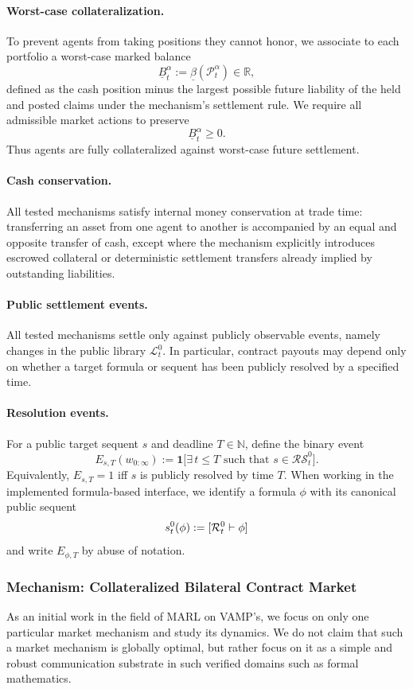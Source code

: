 \paragraph{Worst-case collateralization.}
To prevent agents from taking positions they cannot honor, we associate to each portfolio a worst-case marked balance
\[
\underline B^\alpha_t := \underline\beta(\mathcal P^\alpha_t)\in\mathbb R,
\]
defined as the cash position minus the largest possible future liability of the held and posted claims under the mechanism's settlement rule. We require all admissible market actions to preserve
\[
\underline B^\alpha_t \ge 0.
\]
Thus agents are fully collateralized against worst-case future settlement.

\paragraph{Cash conservation.}
All tested mechanisms satisfy internal money conservation at trade time: transferring an asset from one agent to another is accompanied by an equal and opposite transfer of cash, except where the mechanism explicitly introduces escrowed collateral or deterministic settlement transfers already implied by outstanding liabilities.

\paragraph{Public settlement events.}
All tested mechanisms settle only against publicly observable events, namely changes in the public library $\mathcal L^0_t$. In particular, contract payouts may depend only on whether a target formula or sequent has been publicly resolved by a specified time.


\paragraph{Resolution events.}
For a public target sequent $s$ and deadline $T\in\mathbb N$, define the binary event
\[
E_{s,T}(w_{0:\infty}) := \mathbf 1\big[\exists\, t\le T \text{ such that } s\in \mathcal{RS}^0_t\big].
\]
Equivalently, $E_{s,T}=1$ iff $s$ is publicly resolved by time $T$.
When working in the implemented formula-based interface, we identify a formula $\phi$ with its canonical public sequent
\[
s^0_t(\phi):=[\mathcal R^0_t\vdash \phi]
\]
and write $E_{\phi,T}$ by abuse of notation.



\subsubsection{Mechanism: Collateralized Bilateral Contract Market}
As an initial work in the field of MARL on VAMP's, we focus on only one particular market mechanism and study its dynamics. We do not claim that such a market mechanism is globally optimal, but rather focus on it as a simple and robust communication substrate in such verified domains such as formal mathematics.

